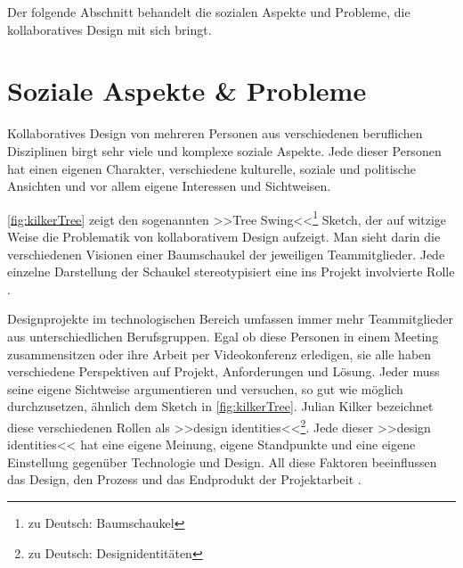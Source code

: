 Der folgende Abschnitt behandelt die sozialen Aspekte und Probleme, die kollaboratives Design mit sich bringt.

\clearpage

\section{Soziale Aspekte \& Probleme} 

Kollaboratives Design von mehreren Personen aus verschiedenen beruflichen Disziplinen birgt sehr viele und komplexe soziale Aspekte. Jede dieser Personen hat einen eigenen Charakter, verschiedene kulturelle, soziale und politische Ansichten und vor allem eigene Interessen und Sichtweisen.

\autoref{fig:kilkerTree} zeigt den sogenannten >>Tree Swing<<\footnote{zu Deutsch: Baumschaukel} Sketch, der auf witzige Weise die Problematik von kollaborativem Design aufzeigt. Man sieht darin die verschiedenen Visionen einer Baumschaukel der jeweiligen Teammitglieder. Jede einzelne Darstellung der Schaukel stereotypisiert eine ins Projekt involvierte Rolle \citep{Kilker:1999}.

\medskip Designprojekte im technologischen Bereich umfassen immer mehr Teammitglieder aus unterschiedlichen Berufsgruppen. Egal ob diese Personen in einem Meeting zusammensitzen oder ihre Arbeit per Videokonferenz erledigen, sie alle haben verschiedene Perspektiven auf Projekt, Anforderungen und Lösung. Jeder muss seine eigene Sichtweise argumentieren und versuchen, so gut wie möglich durchzusetzen, ähnlich dem Sketch in \autoref{fig:kilkerTree}. Julian Kilker bezeichnet diese verschiedenen Rollen als >>design identities<<\footnote{zu Deutsch: Designidentitäten}. Jede dieser >>design identities<< hat eine eigene Meinung, eigene Standpunkte und eine eigene Einstellung gegenüber Technologie und Design. All diese Faktoren beeinflussen das Design, den Prozess und das Endprodukt der Projektarbeit \citep{Kilker:1999}.

